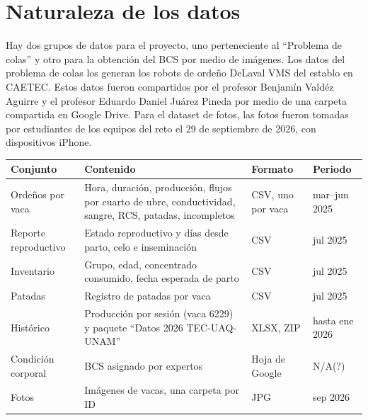 \section{Naturaleza de los datos}

Hay dos grupos de datos para el proyecto, uno perteneciente al “Problema de colas” y otro para la obtención del BCS por medio de imágenes. Los datos del problema de colas los generan los robots de ordeño DeLaval VMS del establo en CAETEC. Estos datos fueron compartidos por el profesor Benjamín Valdéz Aguirre y el profesor Eduardo Daniel Juárez Pineda por medio de una carpeta compartida en Google Drive. Para el dataset de fotos, las fotos fueron tomadas por estudiantes de los equipos del reto el 29 de septiembre de 2026, con dispositivos iPhone.

\begin{table}[htbp]
  \centering
  \small
  \begin{tabularx}{\textwidth}{>{\raggedright\arraybackslash}p{}X>{\raggedright\arraybackslash}p{}>{\raggedright\arraybackslash}p{}}
    \toprule
    Conjunto & Contenido & Formato & Periodo \\
    \midrule
    Ordeños por vaca & Hora, duración, producción, flujos por cuarto de ubre, conductividad, sangre, RCS, patadas, incompletos & 36 CSV, uno por vaca & mar–jun 2025 \\
    Reporte reproductivo & Estado reproductivo y días desde parto, celo e inseminación & CSV & jul 2025 \\
    Inventario & Grupo, edad, concentrado consumido, fecha esperada de parto & CSV & jul 2025 \\
    Patadas & Registro de patadas por vaca & CSV & jul 2025 \\
    Histórico & Producción por sesión (vaca 6229) y paquete “Datos 2026 TEC-UAQ-UNAM” & XLSX, ZIP & hasta ene 2026 \\
    Condición corporal & BCS asignado por expertos & Hoja de Google & N/A(?) \\
    Fotos & Imágenes de vacas, una carpeta por ID & JPG & sep 2026 \\
    \bottomrule
  \end{tabularx}
\end{table}

